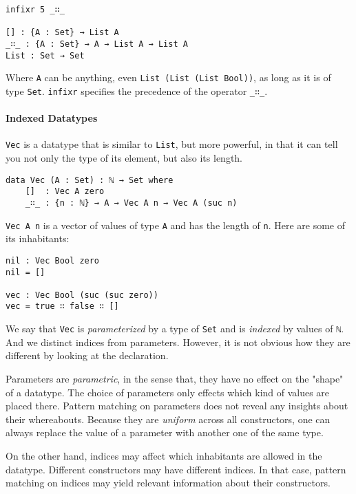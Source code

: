 \documentclass[../thesis.tex]{subfiles}
\begin{document}
\begin{lstlisting}
infixr 5 _∷_

[] : {A : Set} → List A
_∷_ : {A : Set} → A → List A → List A
List : Set → Set
\end{lstlisting}

Where {\lstinline|A|} can be anything, even {\lstinline|List (List (List Bool))|},
as long as it is of type {\lstinline|Set|}. {\lstinline|infixr|} specifies the
precedence of the operator {\lstinline|_∷_|}.

\paragraph{Indexed Datatypes}


{\lstinline|Vec|} is a datatype that is similar to {\lstinline|List|}, but more
powerful, in that it can tell you not only the type of its element, but also its
length.

\begin{lstlisting}
data Vec (A : Set) : ℕ → Set where
    []  : Vec A zero
    _∷_ : {n : ℕ} → A → Vec A n → Vec A (suc n)
\end{lstlisting}

{\lstinline|Vec A n|} is a vector of values of type {\lstinline|A|} and
has the length of {\lstinline|n|}. Here are some of its inhabitants:

\begin{lstlisting}
nil : Vec Bool zero
nil = []

vec : Vec Bool (suc (suc zero))
vec = true ∷ false ∷ []
\end{lstlisting}

We say that {\lstinline|Vec|} is \textit{parameterized} by a type of {\lstinline|Set|}
and is \textit{indexed} by values of {\lstinline|ℕ|}.
And we distinct indices from parameters. However, it is not obvious how they are
different by looking at the declaration.

Parameters are \textit{parametric}, in the sense that, they have no effect on the "shape" of a datatype.
The choice of parameters only effects which kind of values are placed there.
Pattern matching on parameters does not reveal any insights about their whereabouts.
Because they are \textit{uniform} across all constructors, one can always replace
the value of a parameter with another one of the same type.

On the other hand, indices may affect which inhabitants are allowed in the
datatype. Different constructors may have different indices. In that case, pattern
matching on indices may yield relevant information about their constructors.
\end{document}
